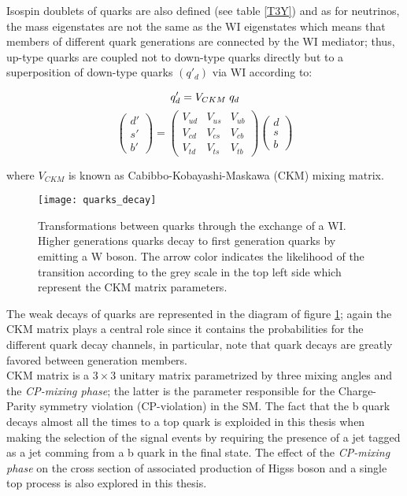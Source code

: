 \noindent Isospin doublets of quarks are also defined (see table \ref{T3Y}) and as for neutrinos, the mass eigenstates are not the same as the WI eigenstates which means that members of different quark generations are connected by the WI mediator; thus, up-type quarks are coupled not to down-type quarks directly but to a superposition of down-type quarks $(q'_d)$ via WI according to: 

$$q'_d = V_{CKM}\hspace{0.1cm}q_d$$
\begin{equation}
\begin{pmatrix}d'\\ s'\\ b'\end{pmatrix}=\begin{pmatrix} V_{ud} & V_{us} & V_{ub}\\ V_{cd} & V_{cs} & V_{cb}\\ V_{td} & V_{ts} & V_{tb}\end{pmatrix}\begin{pmatrix}d\\s\\b\end{pmatrix}
\label{eq:qmixing}
\end{equation}

\noindent where $V_{CKM}$ is known as Cabibbo-Kobayashi-Maskawa (CKM) mixing matrix\cite{C,KM}. 

\begin{figure}[!h]
  \centering
  \texttt{[image: quarks\_decay]}
  \caption[Transformations between quarks]{Transformations between quarks through the exchange of a WI. Higher generations quarks decay to first generation quarks by emitting a W boson. The arrow color indicates the likelihood of the transition according to the grey scale in the top left side which represent the CKM matrix parameters\cite{ckm}.}
  \label{quarks_decay}
\end{figure}

\noindent The weak decays of quarks are represented in the diagram of figure \ref{quarks_decay}; again the CKM matrix plays a central role since it contains the probabilities for the different quark decay channels, in particular, note that quark decays are greatly favored between generation members.\\

\noindent CKM matrix is a $3\times3$ unitary matrix parametrized by three mixing angles and the \textit{CP-mixing phase}; the latter is the parameter responsible for the Charge-Parity symmetry violation (CP-violation) in the SM. The fact that the b quark decays almost all the times to a top quark is exploided in this thesis when making the selection of the signal events by requiring the presence of a jet tagged as a jet comming from a b quark in the final state. The effect of the \textit{CP-mixing phase} on the cross section of associated production of Higss boson and a single top process is also explored in this thesis.    

